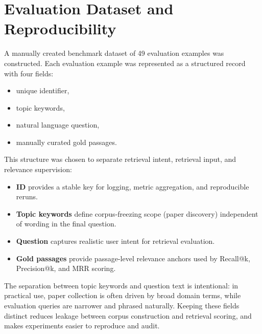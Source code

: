 \documentclass[a4paper,12pt]{article}
\begin{document}
\newpage

\section{Evaluation Dataset and Reproducibility}

A manually created benchmark dataset of 49 evaluation examples was constructed. Each evaluation example was represented as a structured record with four fields:

\begin{itemize}
    \item unique identifier,
    \item topic keywords,
    \item natural language question,
    \item manually curated gold passages.
\end{itemize}

This structure was chosen to separate retrieval intent, retrieval input, and relevance supervision:

\begin{itemize}
    \item \textbf{ID} provides a stable key for logging, metric aggregation, and reproducible reruns.
    \item \textbf{Topic keywords} define corpus-freezing scope (paper discovery) independent of wording in the final question.
    \item \textbf{Question} captures realistic user intent for retrieval evaluation.
    \item \textbf{Gold passages} provide passage-level relevance anchors used by Recall@k, Precision@k, and MRR scoring.
\end{itemize}

The separation between topic keywords and question text is intentional: in practical use, paper collection is often driven by broad domain terms, while evaluation queries are narrower and phrased naturally. Keeping these fields distinct reduces leakage between corpus construction and retrieval scoring, and makes experiments easier to reproduce and audit.
\end{document}
